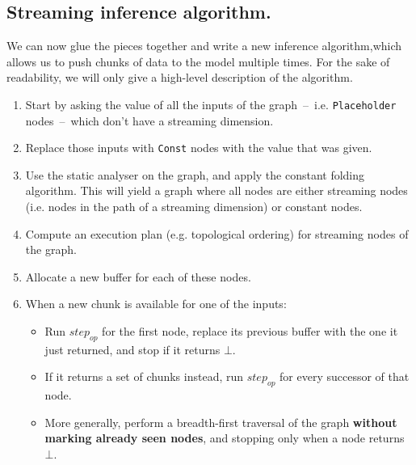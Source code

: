 \documentclass[11pt]{article}
\begin{document}
\bigskip
{}

\subsection{Streaming inference algorithm.}

We can now glue the pieces together and write a new inference algorithm,which allows us to push chunks of data to the model multiple times. For the sake of readability, we will only give a high-level description of the algorithm.

\begin{enumerate}
    \item Start by asking the value of all the inputs of the graph~--~i.e. \texttt{Placeholder} nodes~--~which don't have a streaming dimension.
    \item Replace those inputs with \texttt{Const} nodes with the value that was given.
    \item Use the static analyser on the graph, and apply the constant folding algorithm. This will yield a graph where all nodes are either streaming nodes (i.e. nodes in the path of a streaming dimension) or constant nodes.
    \item Compute an execution plan (e.g. topological ordering) for streaming nodes of the graph.
    \item Allocate a new buffer for each of these nodes.
    \item When a new chunk is available for one of the inputs:
    \begin{itemize}[noitemsep]
        \item Run $step_{op}$ for the first node, replace its previous buffer with the one it just returned, and stop if it returns $\bot$.
        \item If it returns a set of chunks instead, run $step_{op}$ for every successor of that node.
        \item More generally, perform a breadth-first traversal of the graph \textbf{without marking already seen nodes}, and stopping only when a node returns $\bot$.
    \end{itemize}
\end{enumerate}

\bigskip
{}
\end{document}
